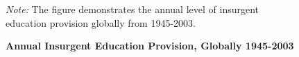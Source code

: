 \documentclass[12pt, letterpaper]{article}
\begin{document}
\newpage
\clearpage
\begin{center}
\begin{figure}[h!]
\renewcommand\thefigure{A.\arabic{figure}}
\begin{center}
\caption{\textbf{Annual Insurgent Education Provision, Globally 1945-2003}}
\label{insurgenteduannual}
\end{center}
\begin{tablenotes}
\raggedright \footnotesize{\textit{Note:} \footnotesize The figure demonstrates the annual level of insurgent education provision globally from 1945-2003.} 
\end{tablenotes}
\end{figure}
\end{center}
\end{document}

